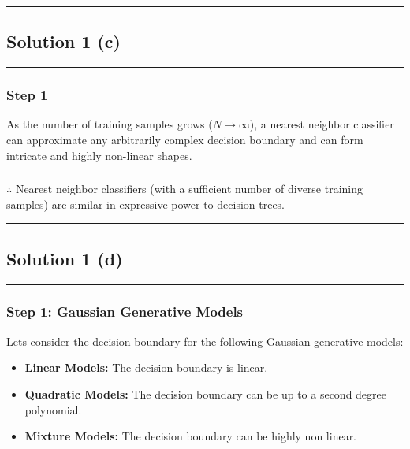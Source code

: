 \documentclass{article}
\begin{document}
\noindent\rule{\textwidth}{0.4pt}

\newpage

\subsection*{Solution 1 (c)}
\noindent\rule{\textwidth}{0.4pt}

\subsubsection*{Step 1}

\parbox{\textwidth}{
As the number of training samples grows ($N \to \infty$), a nearest neighbor classifier can approximate any arbitrarily complex decision boundary and can form intricate and highly non-linear shapes.
}

\subsubsection*{\normalfont}{$\therefore$ Nearest neighbor classifiers (with a sufficient number of diverse training samples) are similar in expressive power to decision trees.}


\noindent\rule{\textwidth}{0.4pt}

\newpage

\subsection*{Solution 1 (d)}
\noindent\rule{\textwidth}{0.4pt}

\subsubsection*{Step 1: Gaussian Generative Models}
\parbox{\textwidth}{
Lets consider the decision boundary for the following Gaussian generative models:
\begin{itemize}
    \item \textbf{Linear Models:} The decision boundary is linear.
    \item \textbf{Quadratic Models:} The decision boundary can be up to a second degree polynomial.
    \item \textbf{Mixture Models:} The decision boundary can be highly non linear.
\end{itemize}
}
\end{document}

